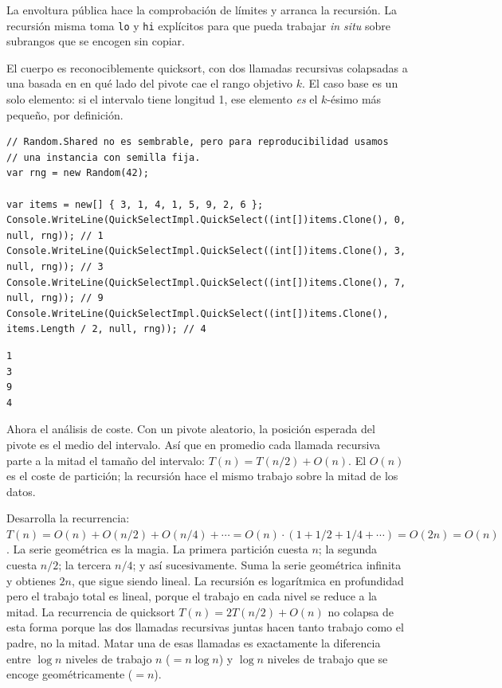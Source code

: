 \documentclass[11pt,a4paper]{article}
\begin{document}
La envoltura pública hace la comprobación de límites y arranca la recursión. La recursión misma toma \texttt{lo} y \texttt{hi} explícitos para que pueda trabajar \emph{in situ} sobre subrangos que se encogen sin copiar.

El cuerpo es reconociblemente quicksort, con dos llamadas recursivas colapsadas a una basada en en qué lado del pivote cae el rango objetivo $k$. El caso base es un solo elemento: si el intervalo tiene longitud 1, ese elemento \emph{es} el $k$-ésimo más pequeño, por definición.

\begin{lstlisting}
// Random.Shared no es sembrable, pero para reproducibilidad usamos
// una instancia con semilla fija.
var rng = new Random(42);

var items = new[] { 3, 1, 4, 1, 5, 9, 2, 6 };
Console.WriteLine(QuickSelectImpl.QuickSelect((int[])items.Clone(), 0, null, rng)); // 1
Console.WriteLine(QuickSelectImpl.QuickSelect((int[])items.Clone(), 3, null, rng)); // 3
Console.WriteLine(QuickSelectImpl.QuickSelect((int[])items.Clone(), 7, null, rng)); // 9
Console.WriteLine(QuickSelectImpl.QuickSelect((int[])items.Clone(), items.Length / 2, null, rng)); // 4
\end{lstlisting}

\begin{verbatim}
1
3
9
4
\end{verbatim}

Ahora el análisis de coste. Con un pivote aleatorio, la posición esperada del pivote es el medio del intervalo. Así que en promedio cada llamada recursiva parte a la mitad el tamaño del intervalo: $T(n) = T(n/2) + O(n)$. El $O(n)$ es el coste de partición; la recursión hace el mismo trabajo sobre la mitad de los datos.

Desarrolla la recurrencia: $T(n) = O(n) + O(n/2) + O(n/4) + \cdots = O(n) \cdot (1 + 1/2 + 1/4 + \cdots) = O(2n) = O(n)$. La serie geométrica es la magia. La primera partición cuesta $n$; la segunda cuesta $n/2$; la tercera $n/4$; y así sucesivamente. Suma la serie geométrica infinita y obtienes $2n$, que sigue siendo lineal. La recursión es logarítmica en profundidad pero el trabajo total es lineal, porque el trabajo en cada nivel se reduce a la mitad. La recurrencia de quicksort $T(n) = 2T(n/2) + O(n)$ no colapsa de esta forma porque las dos llamadas recursivas juntas hacen tanto trabajo como el padre, no la mitad. Matar una de esas llamadas es exactamente la diferencia entre $\log n$ niveles de trabajo $n$ ($= n \log n$) y $\log n$ niveles de trabajo que se encoge geométricamente ($= n$).
\end{document}
